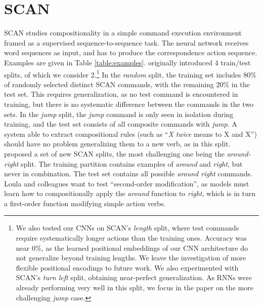\section{SCAN}
\label{sec:setup}

SCAN studies compositionality in a simple command
execution environment framed as a supervised sequence-to-sequence
task. The neural network receives word sequences as input, and has to
produce the correspondence action sequence. Examples are
given in Table \ref{table:examples}.
   originally introduced 4
train/test splits, of which we consider 2.\footnote{We also
  tested our CNNs on SCAN's \emph{length} split, where test commands
  require systematically longer actions than the training
  ones. Accuracy was near 0\%, as the learned positional
  embeddings of our CNN architecture do not 
  generalize beyond  training lengths. We leave the
  investigation of more flexible positional encodings \cite[as in,
  e.g.,][]{vaswani:etal:2017} to future work. We also experimented
  with SCAN's \emph{turn left} split, obtaining near-perfect
  generalization. As RNNs were already performing very well in this split,
  we focus in the paper on the more challenging
  \emph{jump} case.} In the \emph{random} split, the training set
includes 80\% of randomly selected distinct SCAN commands, with the
remaining 20\% in the test set. This requires generalization,
as no test command is encountered in training, but there is no
systematic difference between the commands in the two sets.  In the
\emph{jump} split, the \emph{jump} command is only seen in isolation
during training, and the test set consists of all composite commands
with \emph{jump}. A system able to extract compositional rules (such
as ``\emph{X twice} means to X and X'') should have no problem
generalizing them to a new verb, as in this
split.  proposed a set of new SCAN splits,
the most challenging one being the \emph{around-right}
split.  The training partition contains examples of \emph{around} and
\emph{right}, but never in combination. The test set
contains all possible \emph{around right} commands. Loula and
colleagues want to test ``second-order modification'', as models
must learn how to compositionally apply the \emph{around}
function to \emph{right}, which is in turn a first-order function
modifying simple action verbs.%

